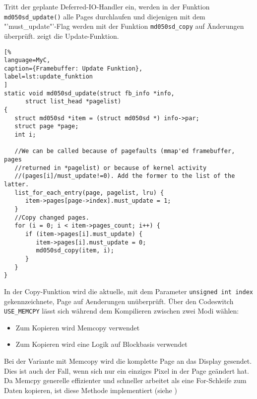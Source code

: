 Tritt der geplante Deferred-IO-Handler ein, werden in der Funktion \lstinline|md050sd_update()| alle Pages durchlaufen und diejenigen mit dem "'must\_update"'-Flag werden mit der Funktion \lstinline|md050sd_copy| auf Änderungen überprüft.
 zeigt die Update-Funktion.
\begin{lstlisting}[%
language=MyC,
caption={Framebuffer: Update Funktion},
label=lst:update_funktion
]
static void md050sd_update(struct fb_info *info,
      struct list_head *pagelist)
{
   struct md050sd *item = (struct md050sd *) info->par;
   struct page *page;
   int i;

   //We can be called because of pagefaults (mmap'ed framebuffer, pages
   //returned in *pagelist) or because of kernel activity
   //(pages[i]/must_update!=0). Add the former to the list of the latter.
   list_for_each_entry(page, pagelist, lru) {
      item->pages[page->index].must_update = 1;
   }
   //Copy changed pages.
   for (i = 0; i < item->pages_count; i++) {
      if (item->pages[i].must_update) {
         item->pages[i].must_update = 0;
         md050sd_copy(item, i);
      }
   }
}
\end{lstlisting}
In der Copy-Funktion wird die aktuelle, mit dem Parameter \lstinline|unsigned int index| gekennzeichnete, Page auf Aenderungen unüberprüft. Über den Codeswitch \lstinline|USE_MEMCPY| lässt sich während dem Kompilieren zwischen zwei Modi wählen:
\begin{itemize}
	\item Zum Kopieren wird Memcopy verwendet
	\item Zum Kopieren wird eine Logik auf Blockbasis verwendet
\end{itemize}

Bei der Variante mit Memcopy wird die komplette Page an das Display gesendet. Dies ist auch der Fall, wenn sich nur ein einziges Pixel in der Page geändert hat. Da Memcpy generelle effizienter und schneller arbeitet als eine For-Schleife zum Daten kopieren, ist diese Methode implementiert (siehe \cite{Nadeau2012})

